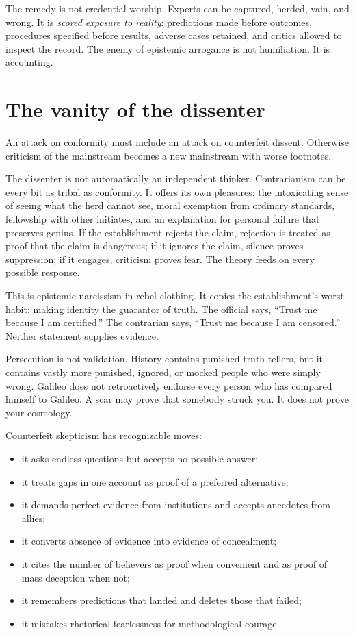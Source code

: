 ﻿\documentclass[12pt,a4paper]{book}
\begin{document}
The remedy is not credential worship. Experts can be captured, herded, vain, and wrong. It is \emph{scored exposure to reality}: predictions made before outcomes, procedures specified before results, adverse cases retained, and critics allowed to inspect the record. The enemy of epistemic arrogance is not humiliation. It is accounting.

\section{The vanity of the dissenter}

An attack on conformity must include an attack on counterfeit dissent. Otherwise criticism of the mainstream becomes a new mainstream with worse footnotes.

The dissenter is not automatically an independent thinker. Contrarianism can be every bit as tribal as conformity. It offers its own pleasures: the intoxicating sense of seeing what the herd cannot see, moral exemption from ordinary standards, fellowship with other initiates, and an explanation for personal failure that preserves genius. If the establishment rejects the claim, rejection is treated as proof that the claim is dangerous; if it ignores the claim, silence proves suppression; if it engages, criticism proves fear. The theory feeds on every possible response.

This is epistemic narcissism in rebel clothing. It copies the establishment's worst habit: making identity the guarantor of truth. The official says, “Trust me because I am certified.” The contrarian says, “Trust me because I am censored.” Neither statement supplies evidence.

Persecution is not validation. History contains punished truth-tellers, but it contains vastly more punished, ignored, or mocked people who were simply wrong. Galileo does not retroactively endorse every person who has compared himself to Galileo. A scar may prove that somebody struck you. It does not prove your cosmology.

Counterfeit skepticism has recognizable moves:

\begin{itemize}
  \item it asks endless questions but accepts no possible answer;
  \item it treats gaps in one account as proof of a preferred alternative;
  \item it demands perfect evidence from institutions and accepts anecdotes from allies;
  \item it converts absence of evidence into evidence of concealment;
  \item it cites the number of believers as proof when convenient and as proof of mass deception when not;
  \item it remembers predictions that landed and deletes those that failed;
  \item it mistakes rhetorical fearlessness for methodological courage.
\end{itemize}
\end{document}
